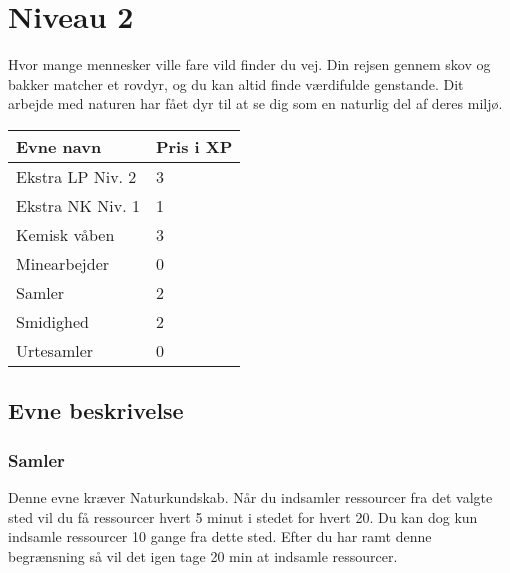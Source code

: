 \chapter*{Niveau 2}

Hvor mange mennesker ville fare vild finder du vej. Din rejsen gennem skov og bakker matcher et rovdyr, og du kan altid finde værdifulde genstande. Dit arbejde med naturen har fået dyr til at se dig som en naturlig del af deres miljø.

\begin{table}[H]
    \centering
    \begin{tabular}{|p{}|p{}|}
    \rowcolor{cerulean!80}\hline
    Evne navn & Pris i XP \\\hline
        Ekstra LP Niv. 2& 3\\\hline
        Ekstra NK Niv. 1& 1\\\hline
        Kemisk våben& 3\\\hline
        Minearbejder& 0\\\hline
        Samler& 2\\\hline
        Smidighed& 2\\\hline
        Urtesamler& 0\\\hline
    \end{tabular}
\end{table}
\section*{Evne beskrivelse}




\subsection*{Samler}
Denne evne kræver Naturkundskab. Når du indsamler ressourcer fra det valgte sted vil du få ressourcer hvert 5 minut i stedet for hvert 20. Du kan dog kun indsamle ressourcer 10 gange fra dette sted. Efter du har ramt denne begrænsning så vil det igen tage 20 min at indsamle ressourcer. 


